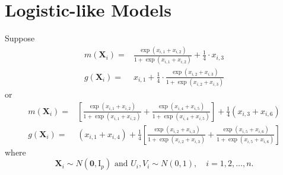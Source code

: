 \documentclass[en,12pt,mtpro2]{elegantpaper}
\begin{document}
\section{Logistic-like Models}

Suppose
\begin{equation}
    \begin{aligned}
        m\left(\mathbf{X}_{i}\right)= & \frac{\exp\left(x_{i,1}+x_{i,2}\right)}{1+\exp\left(x_{i,1}+x_{i,2}\right)}+\frac{1}{4}\cdot x_{i,3} \\
        g\left(\mathbf{X}_{i}\right)= & x_{i,1}+\frac{1}{4}\cdot\frac{\exp\left(x_{i,2}+x_{i,3}\right)}{1+\exp\left(x_{i,2}+x_{i,3}\right)}
    \end{aligned}
    \label{eq:logistic-model-1}
\end{equation}
or
\begin{equation}
    \begin{aligned}
        m\left(\mathbf{X}_{i}\right)= & \left[\frac{\exp\left(x_{i,1}+x_{i,2}\right)}{1+\exp\left(x_{i,1}+x_{i,2}\right)}+\frac{\exp\left(x_{i,4}+x_{i,5}\right)}{1+\exp\left(x_{i,4}+x_{i,5}\right)}\right]+\frac{1}{4}\left(x_{i,3}+x_{i,6}\right) \\
        g\left(\mathbf{X}_{i}\right)= & \left(x_{i,1}+x_{i,4}\right)+\frac{1}{4}\left[\frac{\exp\left(x_{i,2}+x_{i,3}\right)}{1+\exp\left(x_{i,2}+x_{i,3}\right)}+\frac{\exp\left(x_{i,5}+x_{i,6}\right)}{1+\exp\left(x_{i,5}+x_{i,6}\right)}\right]
    \end{aligned}
    \label{eq:logistic-model-2}
\end{equation}
where
\begin{equation*}
    \mathbf{X}_{i}\sim N\left(\boldsymbol{0},\mathrm{I}_{p}\right)\text{ and }U_{i},V_{i}\sim N\left(0,1\right),\quad i=1,2,\ldots,n.
\end{equation*}
\end{document}
